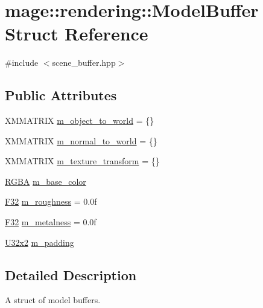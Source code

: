 \hypertarget{structmage_1_1rendering_1_1_model_buffer}{}\section{mage\+:\+:rendering\+:\+:Model\+Buffer Struct Reference}
\label{structmage_1_1rendering_1_1_model_buffer}


{\ttfamily \#include $<$scene\+\_\+buffer.\+hpp$>$}

\subsection*{Public Attributes}
\begin{DoxyCompactItemize}
\item 
X\+M\+M\+A\+T\+R\+IX \mbox{\hyperlink{structmage_1_1rendering_1_1_model_buffer_a1ab813830152789c92ff9313a291c8a2}{m\+\_\+object\+\_\+to\+\_\+world}} = \{\}
\item 
X\+M\+M\+A\+T\+R\+IX \mbox{\hyperlink{structmage_1_1rendering_1_1_model_buffer_a50a4684ae6f0139edc0108971249113a}{m\+\_\+normal\+\_\+to\+\_\+world}} = \{\}
\item 
X\+M\+M\+A\+T\+R\+IX \mbox{\hyperlink{structmage_1_1rendering_1_1_model_buffer_a89ae6a1222a84b0f166f5e46b35411b6}{m\+\_\+texture\+\_\+transform}} = \{\}
\item 
\mbox{\hyperlink{structmage_1_1_r_g_b_a}{R\+G\+BA}} \mbox{\hyperlink{structmage_1_1rendering_1_1_model_buffer_a82c9d6dfd303c1a37c621e3fc4520232}{m\+\_\+base\+\_\+color}}
\item 
\mbox{\hyperlink{namespacemage_aa97e833b45f06d60a0a9c4fc22ae02c0}{F32}} \mbox{\hyperlink{structmage_1_1rendering_1_1_model_buffer_acf90738f4c6cab2922d12e9fc9bf36ca}{m\+\_\+roughness}} = 0.\+0f
\item 
\mbox{\hyperlink{namespacemage_aa97e833b45f06d60a0a9c4fc22ae02c0}{F32}} \mbox{\hyperlink{structmage_1_1rendering_1_1_model_buffer_a4004bcf0d3fe8d0a5596d801d98c438a}{m\+\_\+metalness}} = 0.\+0f
\item 
\mbox{\hyperlink{namespacemage_ae5e7ccf8a1785baaacf57b3a0f4324e2}{U32x2}} \mbox{\hyperlink{structmage_1_1rendering_1_1_model_buffer_a492d1cebe0f390e969ce50957ff9d158}{m\+\_\+padding}}
\end{DoxyCompactItemize}


\subsection{Detailed Description}
A struct of model buffers. 

